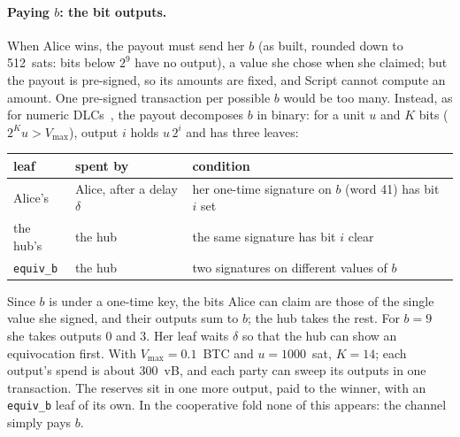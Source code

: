 \documentclass[11pt]{article}
\newcommand{\vmax}{V_{\max}}
\newcommand{\tx}[1]{\texttt{#1}}
\begin{document}
\paragraph{Paying $b$: the bit outputs.} When Alice wins, the payout
must send her $b$ (as built, rounded down to 512~sats: bits below $2^9$
have no output), a value she chose when she claimed; but the
payout is pre-signed, so its amounts are fixed, and Script cannot
compute an amount. One pre-signed transaction per possible $b$ would be
too many. Instead, as for numeric DLCs~\cite{dlcnumeric}, the payout
decomposes $b$ in binary: for a unit $u$ and $K$ bits ($2^K u > \vmax$),
output $i$ holds $u\,2^i$ and has three leaves:
\begin{center}
\small
\begin{tabular}{lll}
\toprule
leaf & spent by & condition \\
\midrule
Alice's & Alice, after a delay $\delta$ & her one-time signature on $b$ (word 41) has bit $i$ set \\
the hub's & the hub & the same signature has bit $i$ clear \\
\tx{equiv\_b} & the hub & two signatures on different values of $b$ \\
\bottomrule
\end{tabular}
\end{center}
Since $b$ is under a one-time key, the bits Alice can claim are those of
the single value she signed, and their outputs sum to $b$; the hub takes
the rest. For $b = 9$ she takes outputs 0 and 3. Her leaf waits $\delta$
so that the hub can show an equivocation first. With $\vmax = 0.1$~BTC
and $u = 1000$~sat, $K = 14$; each output's spend is about 300~vB, and
each party can sweep its outputs in one transaction. The reserves sit in
one more output, paid to the winner, with an \tx{equiv\_b} leaf of its
own. In the cooperative fold none of this appears: the channel simply
pays $b$.
\end{document}
